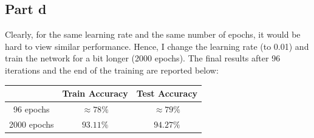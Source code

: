\documentclass{article}
\begin{document}
\subsection*{Part d}
\begin{flushleft}
Clearly, for the same learning rate and the same number of epochs, it would be hard to view similar performance. Hence, I change the learning rate (to 0.01) and train the network for a bit longer (2000 epochs). The final results after 96 iterations and the end of the training are reported below:
\begin{center}
\begin{tabular}{|c|c|c|}
\hline
& Train Accuracy & Test Accuracy \\
\hline
96 epochs & \(\approx 78\%\) & \(\approx 79\%\) \\
\hline
2000 epochs & \(93.11\%\) & \(94.27\%\) \\
\hline
\end{tabular}
\end{center}


\end{flushleft}
\end{document}
